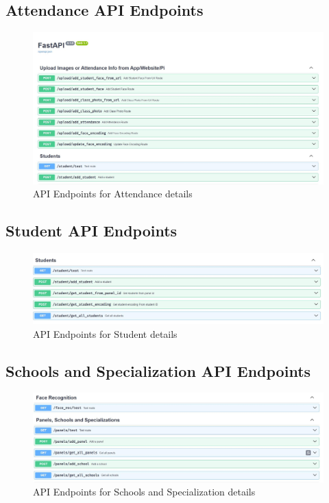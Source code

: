 \documentclass[openany]{report}
\begin{document}
\subsection{Attendance API Endpoints}
\begin{figure}[H]
    \centering
    \includegraphics[width=.99\textwidth]{../imgs/swagger 1.jpg}
    \caption{API Endpoints for Attendance details}
\end{figure}

\subsection{Student API Endpoints}
\begin{figure}[H]
    \centering
    \includegraphics[width=.99\textwidth]{../imgs/swagger 2.jpg}
    \caption{API Endpoints for Student details}
\end{figure}

\subsection{Schools and Specialization API Endpoints}
\begin{figure}[H]
    \centering
    \includegraphics[width=.99\textwidth]{../imgs/swagger 3.jpg}
    \caption{API Endpoints for Schools and Specialization details}
\end{figure}
\end{document}
